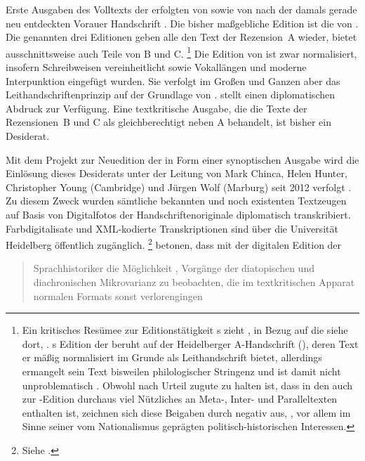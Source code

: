 Erste Ausgaben des Volltexts der \KC{} erfolgten von \citet{massmann:kukb}
sowie von \citet{diemer1849} nach der damals gerade neu entdeckten Vorauer
Handschrift \citep{kc:A1}. Die bisher maßgebliche Edition ist die von
\nosh\citet{schroeder1895}. Die genannten drei Editionen geben alle den Text
der Rezension~A wieder, \citeauthor{massmann:kukb} bietet ausschnittsweise auch
Teile von B und C.%
%
	\footnote{Ein kritisches Resümee zur Editionstätigkeit
		\citeauthor{massmann:kukb}s zieht \citet{wolf2023}, in Bezug auf die
		\textcite{kc} siehe dort, .
		\citeauthor{massmann:kukb}s Edition der \textcite{kc} beruht auf der
		Heidelberger A-Handschrift (\citet{kc:H}), deren Text er mäßig
		normalisiert im Grunde als Leithandschrift bietet, allerdings ermangelt
		sein Text bisweilen philologischer Stringenz und ist damit nicht
		unproblematisch \autocite[125--126]{wolf2023}. Obwohl
		\citeauthor{massmann:kukb} nach  Urteil
		zugute zu halten ist, dass in den  auch zur
		\textcite{kc}-Edition durchaus viel Nützliches an Meta-, Inter- und
		Paralleltexten enthalten ist, zeichnen sich diese Beigaben durch
		 negativ aus, , vor allem im Sinne seiner vom Nationalismus geprägten
		politisch-historischen Interessen.%
	}
%
Die Edition von \citeauthor{schroeder1895} ist zwar normalisiert, insofern
Schreibweisen vereinheitlicht sowie Vokallängen und moderne Interpunktion
eingefügt wurden. Sie verfolgt im Großen und Ganzen aber das
Leit\-handschriften\-prinzip auf der Grundlage von \citet{kc:A1}.
\citeauthor{diemer1849} stellt einen diplomatischen Abdruck zur Verfügung. Eine
textkritische Ausgabe, die die Texte der Rezensionen~B und C als
gleichberechtigt neben A behandelt, ist bisher ein Desiderat.

Mit dem Projekt zur Neuedition der \KC{} in Form einer synoptischen
Ausgabe wird die Einlösung dieses Desiderats unter der Leitung von Mark Chinca,
Helen Hunter, Christopher Young (Cambridge) und Jürgen Wolf (Marburg) seit 2012
verfolgt \autocite{chincaetal2019b}. Zu diesem Zweck wurden sämtliche bekannten
und noch existenten Textzeugen auf Basis von Digitalfotos der
Handschriften\-originale diplomatisch transkribiert. Farb\-digitalisate und
XML-kodierte Transkriptionen sind über die Universität Heidelberg öffentlich
zugänglich.%
%
	\footnote{Siehe \nocite{kcdigital}.}
%
\citet[287]{chincaetal2019b} betonen, dass mit der digitalen Edition der
\KC{} \blockquote{Sprachhistoriker \textelp{}
die Möglichkeit , Vorgänge der dia\-topischen und
dia\-chronischen Mikrovarianz zu beobachten, die im textkritischen Apparat
normalen Formats sonst verlorengingen}.

